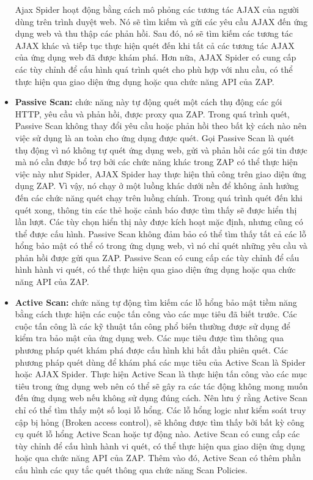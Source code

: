 \begin{itemize}
  \par
  Ajax Spider hoạt động bằng cách mô phỏng các tương tác AJAX của người dùng trên trình duyệt web. Nó sẽ tìm kiếm và gửi các yêu cầu AJAX đến ứng dụng web và thu thập các phản hồi. Sau đó, nó sẽ tìm kiếm các tương tác AJAX khác và tiếp tục thực hiện quét đến khi tất cả các tương tác AJAX của ứng dụng web đã được khám phá. Hơn nữa, AJAX Spider có cung cấp các tùy chỉnh để cấu hình quá trình quét cho phù hợp với nhu cầu, có thể thực hiện qua giao diện ứng dụng hoặc qua chức năng API của ZAP.
  \item \textbf{Passive Scan:} chức năng này tự động quét một cách thụ động các gói HTTP, yêu cầu và phản hồi, được proxy qua ZAP. Trong quá trình quét, Passive Scan không thay đổi yêu cầu hoặc phản hồi theo bất kỳ cách nào nên việc sử dụng là an toàn cho ứng dụng được quét. Gọi Passive Scan là quét thụ động vì nó không tự quét ứng dụng web, gửi và phản hồi các gói tin được mà nó cần được bổ trợ bởi các chức năng khác trong ZAP có thể thực hiện việc này như Spider, AJAX Spider hay thực hiện thủ công trên giao diện ứng dụng ZAP. Vì vậy, nó chạy ở một luồng khác dưới nền để không ảnh hưởng đến các chức năng quét chạy trên luồng chính.
  Trong quá trình quét đến khi quét xong, thông tin các thẻ hoặc cảnh báo được tìm thấy sẽ được hiển thị lần lượt. Các tùy chọn hiển thị này được kích hoạt mặc định, nhưng cũng có thể được cấu hình. Passive Scan không đảm bảo có thể tìm thấy tất cả các lỗ hổng bảo mật có thể có trong ứng dụng web, vì nó chỉ quét những yêu cầu và phản hồi được gửi qua ZAP. Passive Scan có cung cấp các tùy chỉnh để cấu hình hành vi quét, có thể thực hiện qua giao diện ứng dụng hoặc qua chức năng API của ZAP.
  \item \textbf{Active Scan:} chức năng tự động tìm kiếm các lỗ hổng bảo mật tiềm năng bằng cách thực hiện các cuộc tấn công vào các mục tiêu đã biết trước. Các cuộc tấn công là các kỹ thuật tấn công phổ biến thường được sử dụng để kiểm tra bảo mật của ứng dụng web. Các mục tiêu được tìm thông qua phương pháp quét khám phá được cấu hình khi bắt đầu phiên quét. Các phương pháp quét dùng để khám phá các mục tiêu của Active Scan là Spider hoặc AJAX Spider.
  Thực hiện Active Scan là thực hiện tấn công vào các mục tiêu trong ứng dụng web nên có thể sẽ gây ra các tác động không mong muốn đến ứng dụng web nếu không sử dụng đúng cách. Nên lưu ý rằng Active Scan chỉ có thể tìm thấy một số loại lỗ hổng. Các lỗ hổng logic như kiểm soát truy cập bị hỏng (Broken access control), sẽ không được tìm thấy bởi bất kỳ công cụ quét lỗ hổng Active Scan hoặc tự động nào. Active Scan có cung cấp các tùy chỉnh để cấu hình hành vi quét, có thể thực hiện qua giao diện ứng dụng hoặc qua chức năng API của ZAP. Thêm vào đó, Active Scan có thêm phần cấu hình các quy tắc quét thông qua chức năng Scan Policies.

\end{itemize}
